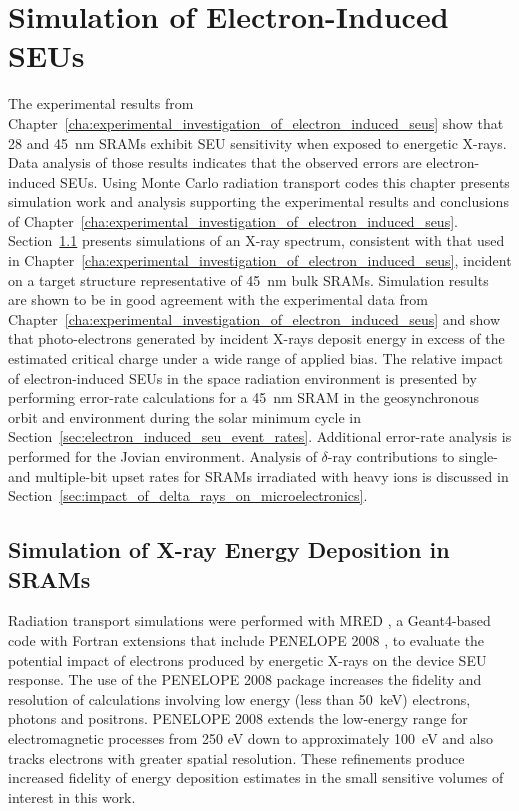 \chapter{Simulation of Electron-Induced SEUs} %
\label{ch:simulation_of_electron_induced_seus}
The experimental results from Chapter~\ref{cha:experimental_investigation_of_electron_induced_seus} show that 28 and 45~nm SRAMs exhibit SEU sensitivity when exposed to energetic X-rays. 
Data analysis of those results indicates that the observed errors are electron-induced SEUs.
Using Monte Carlo radiation transport codes this chapter presents simulation work and analysis supporting the experimental results and conclusions of Chapter~\ref{cha:experimental_investigation_of_electron_induced_seus}.
Section~\ref{sec:simulation_of_x_ray_energy_deposition_in_srams} presents simulations of an X-ray spectrum, consistent with that used in Chapter~\ref{cha:experimental_investigation_of_electron_induced_seus}, incident on a target structure representative of 45~nm bulk SRAMs.
Simulation results are shown to be in good agreement with the experimental data from Chapter~\ref{cha:experimental_investigation_of_electron_induced_seus} and show that photo-electrons generated by incident X-rays deposit energy in excess of the estimated critical charge under a wide range of applied bias.
The relative impact of electron-induced SEUs in the space radiation environment is presented by performing error-rate calculations for a 45~nm SRAM in the geosynchronous orbit and environment during the solar minimum cycle in Section~\ref{sec:electron_induced_seu_event_rates}.
Additional error-rate analysis is performed for the Jovian environment.
Analysis of $\delta$-ray contributions to single- and multiple-bit upset rates for SRAMs irradiated with heavy ions is discussed in Section~\ref{sec:impact_of_delta_rays_on_microelectronics}.

\section{Simulation of X-ray Energy Deposition in SRAMs} %
\label{sec:simulation_of_x_ray_energy_deposition_in_srams}
Radiation transport simulations were performed with MRED \cite{Weller:2010ud}, a Geant4-based code \cite{Agostinelli:2003vd} with Fortran extensions that include PENELOPE 2008 \cite{Salvat:ue}, to evaluate the potential impact of electrons produced by energetic X-rays on the device SEU response. 
The use of the PENELOPE 2008 package \cite{Salvat:ue} increases the fidelity and resolution of calculations involving low energy (less than 50~keV) electrons, photons and positrons.
PENELOPE 2008 extends the low-energy range for electromagnetic processes from 250 eV down to approximately 100~eV and also tracks electrons with greater spatial resolution. 
These refinements produce increased fidelity of energy deposition estimates in the small sensitive volumes of interest in this work.%

